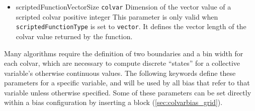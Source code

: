 {\begin{itemize}
 \item %
  \key
    {scriptedFunctionVectorSize}{%
    \texttt{colvar}}{%
    Dimension of the vector value of a scripted colvar}{%
    positive integer}{%
    This parameter is only valid when \texttt{scriptedFunctionType} is
    set to \texttt{vector}. It defines the vector length of the colvar value
    returned by the function.}
\end{itemize}
}\fi %




Many algorithms require the definition of two boundaries and a bin width for each colvar, which are necessary to compute discrete ``states'' for a collective variable's otherwise continuous values.
The following keywords define these parameters for a specific variable, and will be used by all bias that refer to that variable unless otherwise specified.
Some of these parameters can be set directly within a bias configuration by inserting a  block (\ref{sec:colvarbias_grid}).

